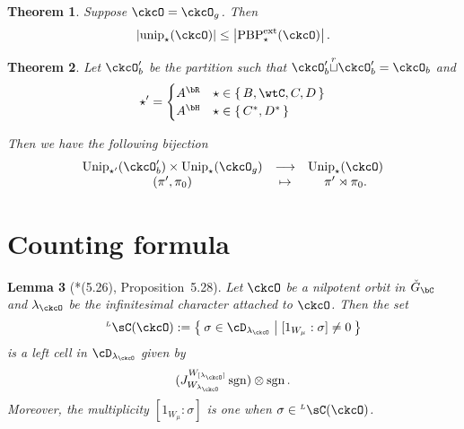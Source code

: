\documentclass[12pt,a4paper]{amsart}
\def\abs#1{\left|{#1}\right|}
\newcommand{\sgn}{\operatorname{sgn}}
\numberwithin{equation}{section}
\newtheorem{thm}{Theorem}[section]
\newtheorem{lem}[thm]{Lemma}
\theoremstyle{remark}
\def\unip{\mathrm{unip}}
\def\Unip{\mathrm{Unip}}
\def\ckGc{\check{G}_{\bC}}
\def\dBV{d_{\mathrm{BV}}}
\def\lamck{\lambda_\ckcO}
\def\WLamck{W_{[\lambda_{\ckcO}]}}
\def\Wlamck{W_{\lamck}}
\def\LC{{}^{\scriptscriptstyle L}\sC}
\def\cuprow{{\stackrel{r}{\sqcup}}}
\def\PBPes{\mathrm{PBP}^{\mathrm{ext}}_{\star}}
\begin{document}
\begin{thm}
  Suppose $\ckcO = \ckcO_{g}$. Then
  \[
    \abs{\unip_{\star}(\ckcO)} \leq \abs{\PBPes(\ckcO)}.
  \]
\end{thm}


\begin{thm}
  Let $\ckcO'_{b}$ be the partition such that $\ckcO'_{b}\cuprow \ckcO'_{b}
  = \ckcO_{b}$    %
  and
  \[\star' =
  \begin{cases}
     A^{\bR} & \star \in \set{B,\wtC,C,D}\\
     A^{\bH} & \star \in \set{C^{*},D^{*}}\\
    \end{cases}
  \]

  Then we have the following bijection
  \[
    \begin{array}{ccc}
    \Unip_{\star'}(\ckcO'_{b}) \times \Unip_{\star}(\ckcO_{g})
      & \longrightarrow & \Unip_{\star}(\ckcO)\\
      (\pi',\pi_{0})& \mapsto & \pi'\rtimes \pi_{0}.
    \end{array}
  \]
\end{thm}



\section{Counting formula}


 \begin{lem}[{\cite{BVUni}*{(5.26), Proposition~5.28}}]\label{lem:lcell.BV}
  Let $\ckcO$ be a nilpotent orbit in $\ckGc$ and $\lamck$ be the infinitesimal
  character attached to $\ckcO$.
  Then the set
  \[
    \LC(\ckcO) := \Set{ \sigma \in \cD_{\lamck}| [1_{W_{\mu}}:\sigma]\neq 0}
  \]
  is a left cell in $\cD_{\lamck}$ given by
  \[
    (J_{\Wlamck}^{\WLamck} \sgn )\otimes \sgn.
  \]
  Moreover, the multiplicity $[1_{W_{\mu}}:\sigma]$ is one
  when $\sigma\in \LC(\ckcO)$.
\end{lem}
\end{document}
